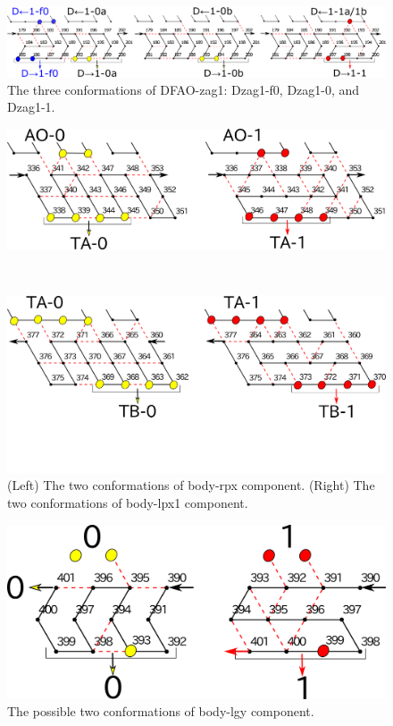 \documentclass[runningheads]{llncs}
\begin{document}
\begin{figure}[h]
  \includegraphics[width=\linewidth]{pic/DFAO-zag1.png}
  \caption{The three conformations of DFAO-zag1: Dzag1-f0, Dzag1-0, and Dzag1-1.}
  \label{fig:DFAO-zag1}
\end{figure} 


\begin{figure}[h]
\centering
\begin{minipage}{0.45\linewidth}
\centering
\includegraphics[width=\linewidth]{pic/body-rpx1.png}
\end{minipage}
\begin{minipage}{0.05\linewidth}
\ \\
\end{minipage}
\begin{minipage}{0.45\linewidth}
\centering
\includegraphics[width=\linewidth]{pic/body-lpx1.png}
\end{minipage}
\caption{(Left) The two conformations of body-rpx component. 
(Right) The two conformations of body-lpx1 component.}
\label{fig:body-rpx}
\end{figure}

\begin{figure}[h]
\centering
\includegraphics[width=0.5\linewidth]{pic/body-lgy.png}
\caption{The possible two conformations of body-lgy component.}
\label{fig:body-lgy}
\end{figure}
\end{document}
